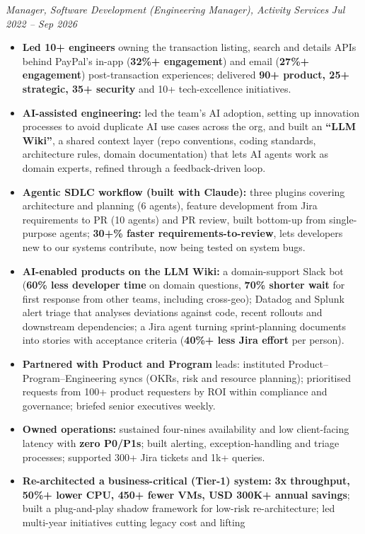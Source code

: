 \documentclass[10pt,a4paper]{article}
\newcommand{\bd}[1]{\textbf{#1}}
\newcommand{\role}[2]{%
  \par\vspace{2pt}\noindent\textcolor{rolecolor}{\textit{#1}}\hfill
  \textcolor{rolecolor}{\textit{#2}}\par\nopagebreak}
\begin{document}
\role{Manager, Software Development (Engineering Manager), Activity Services}{Jul 2022 -- Sep 2026}
\begin{itemize}
\item \bd{Led 10+ engineers} owning the transaction listing, search and details APIs behind
  PayPal's in-app (\bd{32\%+ engagement}) and email (\bd{27\%+ engagement}) post-transaction
  experiences; delivered \bd{90+ product, 25+ strategic, 35+ security} and 10+ tech-excellence
  initiatives.
\item \bd{AI-assisted engineering:} led the team's AI adoption, setting up innovation processes
  to avoid duplicate AI use cases across the org, and built an \bd{``LLM Wiki''}, a shared context
  layer (repo conventions, coding standards, architecture rules, domain documentation) that lets
  AI agents work as domain experts, refined through a feedback-driven loop.
\item \bd{Agentic SDLC workflow (built with Claude):} three plugins covering architecture and
  planning (6 agents), feature development from Jira requirements to PR (10 agents) and PR
  review, built bottom-up from single-purpose agents; \bd{30+\% faster requirements-to-review},
  lets developers new to our systems contribute, now being tested on system bugs.
\item \bd{AI-enabled products on the LLM Wiki:} a domain-support Slack bot (\bd{60\% less
  developer time} on domain questions, \bd{70\% shorter wait} for first response from other
  teams, including cross-geo); Datadog and Splunk alert triage that analyses deviations against
  code, recent rollouts and downstream dependencies; a Jira agent turning sprint-planning
  documents into stories with acceptance criteria (\bd{40\%+ less Jira effort} per person).
\item \bd{Partnered with Product and Program} leads: instituted Product--Program--Engineering
  syncs (OKRs, risk and resource planning); prioritised requests from 100+ product requesters
  by ROI within compliance and governance; briefed senior executives weekly.
\item \bd{Owned operations:} sustained four-nines availability and low client-facing latency
  with \bd{zero P0/P1s}; built alerting, exception-handling and triage processes; supported
  300+ Jira tickets and 1k+ queries.
\item \bd{Re-architected a business-critical (Tier-1) system:} \bd{3x throughput, 50\%+ lower
  CPU, 450+ fewer VMs, USD 300K+ annual savings}; built a plug-and-play shadow framework for
  low-risk re-architecture; led multi-year initiatives cutting legacy cost and lifting

\end{itemize}
\end{document}
